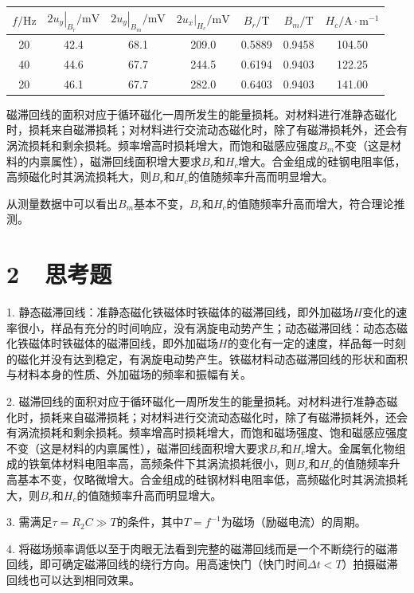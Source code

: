 \documentclass[a4paper,fontset=windows]{ctexart}
\begin{document}
\begin{table}[!ht]
    \centering
    \begin{tabular}{|c|c|c|c|c|c|c|}
        \hline
        $f/\mathrm{Hz}$ & $\left.2u_y\right|_{B_r}/\mathrm{mV}$ & $\left.2u_y\right|_{B_m}/\mathrm{mV}$ & $\left.2u_x\right|_{H_c}/\mathrm{mV}$ & $B_r/\mathrm{T}$ & $B_m/\mathrm{T}$ & $H_c/\mathrm{A \cdot m^{-1}}$ \\
        \hline
        20 & 42.4 & 68.1 & 209.0 & 0.5889 & 0.9458 & 104.50 \\
        \hline
        40 & 44.6 & 67.7 & 244.5 & 0.6194 & 0.9403 & 122.25 \\
        \hline
        20 & 46.1 & 67.7 & 282.0 & 0.6403 & 0.9403 & 141.00 \\
        \hline
    \end{tabular}
\end{table}

磁滞回线的面积对应于循环磁化一周所发生的能量损耗。对材料进行准静态磁化时，损耗来自磁滞损耗；对材料进行交流动态磁化时，除了有磁滞损耗外，还会有涡流损耗和剩余损耗。频率增高时损耗增大，而饱和磁感应强度$B_m$不变（这是材料的内禀属性），磁滞回线面积增大要求$B_r$和$H_c$增大。合金组成的硅钢电阻率低，高频磁化时其涡流损耗大，则$B_r$和$H_c$的值随频率升高而明显增大。

从测量数据中可以看出$B_m$基本不变，$B_r$和$H_c$的值随频率升高而增大，符合理论推测。

\section*{2\ \ 思考题}

1. 静态磁滞回线：准静态磁化铁磁体时铁磁体的磁滞回线，即外加磁场$H$变化的速率很小，样品有充分的时间响应，没有涡旋电动势产生；动态磁滞回线：动态态磁化铁磁体时铁磁体的磁滞回线，即外加磁场$H$的变化有一定的速度，样品每一时刻的磁化并没有达到稳定，有涡旋电动势产生。铁磁材料动态磁滞回线的形状和面积与材料本身的性质、外加磁场的频率和振幅有关。

2. 磁滞回线的面积对应于循环磁化一周所发生的能量损耗。对材料进行准静态磁化时，损耗来自磁滞损耗；对材料进行交流动态磁化时，除了有磁滞损耗外，还会有涡流损耗和剩余损耗。频率增高时损耗增大，而饱和磁场强度、饱和磁感应强度不变（这是材料的内禀属性），磁滞回线面积增大要求$B_r$和$H_c$增大。金属氧化物组成的铁氧体材料电阻率高，高频条件下其涡流损耗很小，则$B_r$和$H_c$的值随频率升高基本不变，仅略微增大。合金组成的硅钢材料电阻率低，高频磁化时其涡流损耗大，则$B_r$和$H_c$的值随频率升高而明显增大。

3. 需满足$\tau=R_2 C \gg T$的条件，其中$T=f^{-1}$为磁场（励磁电流）的周期。

4. 将磁场频率调低以至于肉眼无法看到完整的磁滞回线而是一个不断绕行的磁滞回线，即可确定磁滞回线的绕行方向。用高速快门（快门时间$\Delta t < T$）拍摄磁滞回线也可以达到相同效果。
\end{document}
